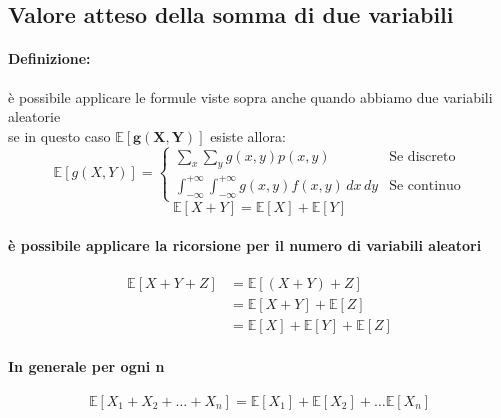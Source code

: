 \documentclass[]{article}
\newcommand{\ev}{\mathbb{E}[X]}
\renewcommand{\ev}[1]{\mathbb{E}[#1]}
\newcommand{\definizione}{\paragraph{Definizione:}}
\begin{document}
    \subsection{Valore atteso della somma di due variabili}
    \definizione è possibile applicare le formule viste sopra anche quando abbiamo due variabili aleatorie \\
    \linebreak[4]
    se in questo caso $\boldsymbol{\ev{g(X,Y)}}$ esiste allora: \\
    \begin{equation*}
        \ev{g(X,Y)} =
        \begin{cases}
            \sum_{x}^{} \sum_{y}^{} g(x,y) p(x,y) & \text{Se discreto} \\
            \int_{-\infty}^{+\infty} \int_{-\infty}^{+\infty} g(x,y) f(x,y) \, dx \, dy & \text{Se continuo}
        \end{cases}
    \end{equation*}
    \linebreak[4]
    \[ \ev{X + Y} = \ev{X} + \ev{Y} \]

    \paragraph{è possibile applicare la ricorsione per il numero di variabili aleatori}
    \begin{equation*}
        \begin{split}
            \ev{X + Y + Z} &= \ev{(X + Y) + Z} \\
            & = \ev{X + Y} + \ev{Z} \\
            & = \ev{X} + \ev{Y} + \ev{Z}
        \end{split}
    \end{equation*}
    \paragraph{In generale per ogni n}
    \[ \ev{X_1 + X_2 + \ldots + X_n} = \ev{X_1} + \ev{X_2} + \ldots \ev{X_n} \]
\end{document}
